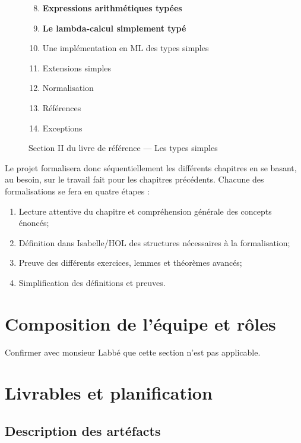 \documentclass[a4paper, oneside, 12pt, titlepage, draft]{article}
\begin{document}
\begin{figure}[h]
  \begin{center}
    \begin{enumerate}[label=§\arabic*]
        \setcounter{enumi}{7}
      \item \textbf{Expressions arithmétiques typées}
      \item \textbf{Le lambda-calcul simplement typé}
      \item Une implémentation en ML des types simples
      \item Extensions simples
      \item Normalisation
      \item Références
      \item Exceptions
    \end{enumerate}
  \end{center}
  \caption{Section II du livre de référence --- Les types simples}
  \label{fig:TAPL-section-2}
\end{figure}

Le projet formalisera donc séquentiellement les différents chapitres en se basant, au besoin, sur le
travail fait pour les chapitres précédents. Chacune des formalisations se fera en quatre étapes :

\begin{enumerate}
  \item Lecture attentive du chapitre et compréhension générale des concepts énoncés;
  \item Définition dans Isabelle/HOL des structures nécessaires à la formalisation;
  \item Preuve des différents exercices, lemmes et théorèmes avancés;
  \item Simplification des définitions et preuves.
\end{enumerate}

\section{Composition de l'équipe et rôles}

Confirmer avec monsieur Labbé que cette section n'est pas applicable.

\section{Livrables et planification}

\subsection{Description des artéfacts}
\end{document}
